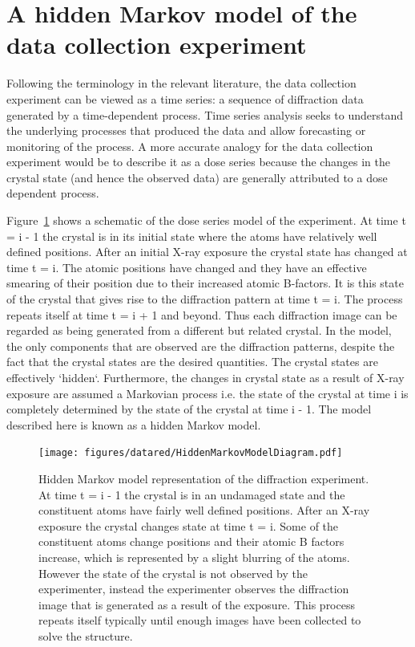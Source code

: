 \section{A hidden Markov model of the data collection experiment}
\label{sec:A hidden Markov model of the data collection experiment}
Following the terminology in the relevant literature, the data collection experiment can be viewed as a time series: a sequence of diffraction data generated by a time-dependent process.
Time series analysis seeks to understand the underlying processes that produced the data and allow forecasting or monitoring of the process.
A more accurate analogy for the data collection experiment would be to describe it as a dose series because the changes in the crystal state (and hence the observed data) are generally attributed to a dose dependent process.

Figure~\ref{fig:Hidden Markov Model diagram} shows a schematic of the dose series model of the experiment.
At time t = i - 1 the crystal is in its initial state where the atoms have relatively well defined positions.
After an initial X-ray exposure the crystal state has changed at time t = i.
The atomic positions have changed and they have an effective smearing of their position due to their increased atomic B-factors.
It is this state of the crystal that gives rise to the diffraction pattern at time t = i.
The process repeats itself at time t = i + 1 and beyond.
Thus each diffraction image can be regarded as being generated from a different but related crystal.
In the model, the only components that are observed are the diffraction patterns, despite the fact that the crystal states are the desired quantities.
The crystal states are effectively `hidden`.
Furthermore, the changes in crystal state as a result of X-ray exposure are assumed a Markovian process i.e. the state of the crystal at time i is completely determined by the state of the crystal at time i - 1.
The model described here is known as a hidden Markov model.
\begin{figure}[ht!]
    \centering
    \texttt{[image: figures/datared/HiddenMarkovModelDiagram.pdf]}
    \caption[Hidden Markov model representation of the diffraction experiment.]{Hidden Markov model representation of the diffraction experiment.
    At time t = i - 1 the crystal is in an undamaged state and the constituent atoms have fairly well defined positions.
    After an X-ray exposure the crystal changes state at time t = i.
    Some of the constituent atoms change positions and their atomic B factors increase, which is represented by a slight blurring of the atoms.
    However the state of the crystal is not observed by the experimenter, instead the experimenter observes the diffraction image that is generated as a result of the exposure.
    This process repeats itself typically until enough images have been collected to solve the structure.}
    \label{fig:Hidden Markov Model diagram}
\end{figure}

